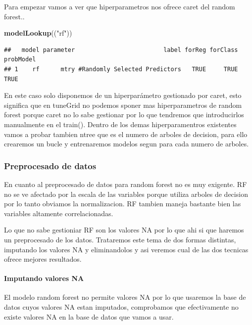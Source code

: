 \documentclass[
]{article}
\newenvironment{Shaded}{\begin{snugshade}}{\end{snugshade}}
\newcommand{\FunctionTok}[1]{\textcolor[rgb]{0.13,0.29,0.53}{\textbf{#1}}}
\newcommand{\NormalTok}[1]{#1}
\newcommand{\StringTok}[1]{\textcolor[rgb]{0.31,0.60,0.02}{#1}}
\begin{document}
Para empezar vamos a ver que hiperparametros nos ofrece caret del random
forest..

\begin{Shaded}
\begin{Highlighting}[]
\FunctionTok{modelLookup}\NormalTok{((}\StringTok{"rf"}\NormalTok{))}
\end{Highlighting}
\end{Shaded}

\begin{verbatim}
##   model parameter                         label forReg forClass probModel
## 1    rf      mtry #Randomly Selected Predictors   TRUE     TRUE      TRUE
\end{verbatim}

En este caso solo disponemos de un hiperparámetro gestionado por caret,
esto significa que en tuneGrid no podemos sponer mas hiperparametros de
random forest porque caret no lo sabe gestionar por lo que tendremos que
introducirlos manualmente en el train(). Dentro de los demas
hiperparamentros existentes vamos a probar tambien ntree que es el
numero de arboles de decision, para ello crearemos un bucle y
entrenaremos modelos segun para cada numero de arboles.

\hypertarget{preprocesado-de-datos}{%
\subsubsection{Preprocesado de datos}\label{preprocesado-de-datos}}

En cuanto al preprocesado de datos para random forest no es muy
exigente. RF no se ve afectado por la escala de las variables porque
utiliza arboles de decision por lo tanto obviamos la normalizacion. RF
tambien maneja bastante bien las variables altamente correlacionadas.

Lo que no sabe gestioniar RF son los valores NA por lo que ahi si que
haremos un preprocesado de los datos. Trataremos este tema de dos formas
distintas, imputando los valores NA y eliminandolos y asi veremos cual
de las dos tecnicas ofrece mejores resultados.

\hypertarget{imputando-valores-na}{%
\paragraph{Imputando valores NA}\label{imputando-valores-na}}

El modelo random forest no permite valores NA por lo que usaremos la
base de datos cuyos valores NA estan imputados, comprobamos que
efectivamente no existe valores NA en la base de datos que vamos a usar.
\end{document}
